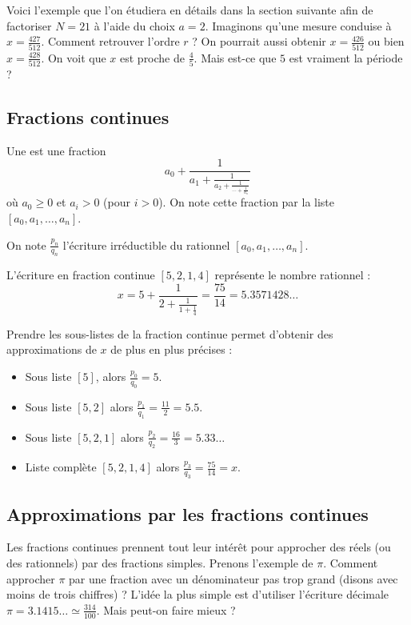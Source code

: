 \documentclass[11pt,class=report,crop=false]{standalone}
\begin{document}
Voici l'exemple que l'on étudiera en détails dans la section suivante afin de factoriser
$N=21$ à l'aide du choix $a=2$. 
Imaginons qu'une mesure conduise à $x = \frac{427}{512}$. Comment retrouver l'ordre $r$ ? On pourrait aussi obtenir $x = \frac{426}{512}$ ou bien $x = \frac{428}{512}$.
On voit que $x$ est proche de $\frac45$. Mais est-ce que $5$ est vraiment la période ? 

\subsection{Fractions continues}


Une  est une fraction 
$$a_0 + \frac{1}{a_1 + \frac{1}{a_2+\frac{1}{\cdots+\frac{1}{a_n}}}}$$
où $a_0\ge0$ et $a_i>0$ (pour $i>0$). On note cette fraction par la liste $[a_0,a_1,\ldots,a_n]$.

On note $\frac{p_n}{q_n}$ l'écriture irréductible du rationnel $[a_0,a_1,\ldots,a_n]$.

\begin{exemple}
L'écriture en fraction continue $[5,2,1,4]$ représente le nombre rationnel :
$$x = 5 + \frac{1}{2 + \frac{1}{1 + \frac{1}{4}}} = \frac{75}{14} =  5.3571428\ldots$$

Prendre les sous-listes de la fraction continue permet d'obtenir des approximations de $x$ de plus en plus précises :
\begin{itemize}
  \item Sous liste $[5]$, alors $\frac{p_0}{q_0} = 5$.
  \item Sous liste $[5,2]$ alors $\frac{p_1}{q_1} = \frac{11}{2} = 5.5$.
  \item Sous liste $[5,2,1]$ alors $\frac{p_2}{q_2} = \frac{16}{3} = 5.33\ldots$
  \item Liste complète $[5,2,1,4]$ alors $\frac{p_3}{q_3} = \frac{75}{14} = x$.
\end{itemize}

\end{exemple}

\subsection{Approximations par les fractions continues}

Les fractions continues prennent tout leur intérêt pour approcher des réels (ou des rationnels) par des fractions simples.
Prenons l'exemple de $\pi$. Comment approcher $\pi$ par une fraction avec un dénominateur pas trop grand (disons avec moins de trois chiffres) ?
L'idée la plus simple est d'utiliser l'écriture décimale $\pi = 3.1415\ldots \simeq \frac{314}{100}$. Mais peut-on faire mieux ?
\end{document}

